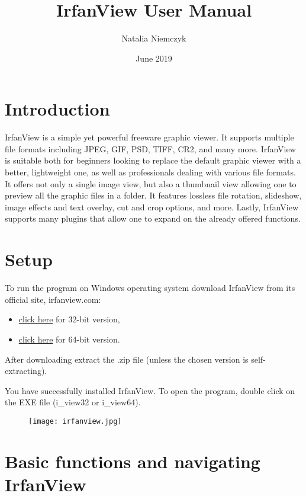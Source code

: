 \documentclass[
	fontsize=10pt, 
	twoside=true, 
	numbers=noenddot, 
]{kaobook}
\title{IrfanView User Manual}
\author{Natalia Niemczyk}
\date{June 2019}
\begin{document}
\maketitle
\tableofcontents
\section{Introduction}
\par IrfanView is a simple yet powerful freeware graphic viewer. It supports multiple file formats including JPEG, GIF, PSD, TIFF, CR2, and many more. IrfanView is suitable both for beginners looking to replace the default graphic viewer with a better, lightweight one, as well as professionals dealing with various file formats. It offers not only a single image view, but also a thumbnail view allowing one to preview all the graphic files in a folder. It features lossless file rotation, slideshow, image effects and text overlay, cut and crop options, and more. Lastly, IrfanView supports many plugins that allow one to expand on the already offered functions.

\section{Setup}
\par To run the program on Windows operating system download IrfanView from its official site, irfanview.com:
\begin{itemize}
    \item \href{https://www.IrfanView.com/main_download_engl.htm}{click here} for 32-bit version,
    \item \href{https://www.IrfanView.com/64bit.htm}{click here} for 64-bit version.
\end{itemize}{}
\par After downloading extract the .zip file (unless the chosen version is self-extracting).
\par You have successfully installed IrfanView. To open the program, double click on the EXE file (i\_view32 or i\_view64).
\begin{figure}[h]
    \centering
    \texttt{[image: irfanview.jpg]}
    \label{IrfanView installation folder and program window.}
\end{figure}

\section{Basic functions and navigating IrfanView}
\end{document}
